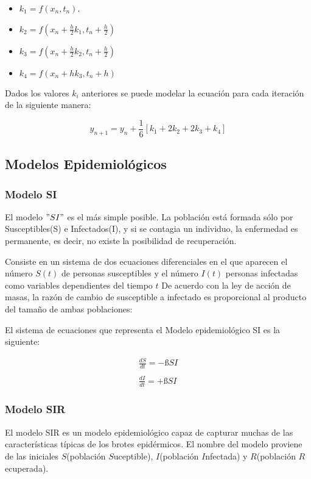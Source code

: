 \documentclass[a4paper,12pt]{article}
\begin{document}
\begin{itemize}
    \item $k_1 = f(x_n,t_n)$.
    \item $k_2 = f(x_n +\frac{h}{2}k_1 , t_n + \frac{h}{2} )$   
    \item $k_3 = f(x_n + \frac{h}{2}k_2 , t_n + \frac{h}{2})$ 
    \item $k_4 = f(x_n + hk_3 , t_n+ h)$
\end{itemize}

Dados los valores $k_i$ anteriores se puede modelar la ecuación para cada iteración de la siguiente manera: \par

\[y_{n+1} = y_n + \frac{1}{6}[k_1 + 2k_2 + 2k_3 + k_4]  \]
 
\subsection{Modelos Epidemiológicos}

\subsubsection{Modelo SI}

El modelo $"SI"$ es el más simple posible. La población está formada sólo por
Susceptibles(S) e Infectados(I), y si se contagia un individuo, la enfermedad es permanente, es decir, no existe la posibilidad de recuperación. \par

Consiste en un sistema de dos ecuaciones diferenciales en el que aparecen el número
$S(t)$ de personas susceptibles y el número $I(t)$ personas infectadas como variables dependientes del tiempo $t$ De acuerdo con la ley de acción de masas, la razón de cambio de susceptible a infectado es proporcional al producto del tamaño de ambas poblaciones:

El sistema de ecuaciones que representa el Modelo epidemiológico SI es la siguiente:

\begin{eqnarray}
   \frac{dS}{dt} = -ßSI \\
    \nonumber \\
   \frac{dI}{dt} = +ßSI  
\end{eqnarray}


\subsubsection{Modelo SIR}
El modelo SIR es un modelo epidemiológico capaz de capturar muchas de las características típicas de los brotes epidérmicos. El nombre del modelo proviene de las iniciales $S$(población $S$uceptible), $I$(población $I$nfectada) y $R$(población $R$ecuperada). \par
\end{document}
